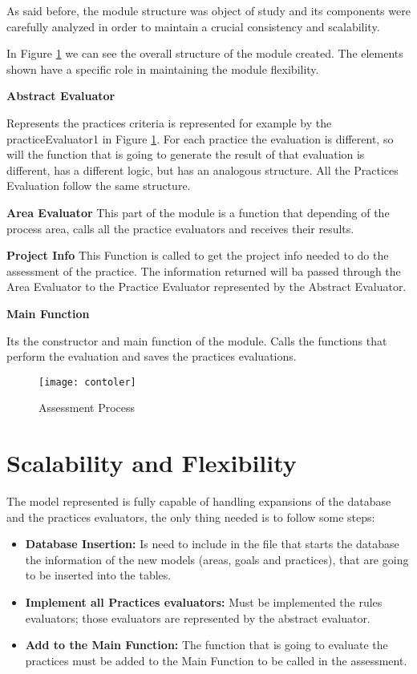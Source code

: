 As said before, the module structure was object of study and its components were carefully analyzed in order to maintain a crucial consistency and scalability.

In Figure \ref{fig:esquema} we can see the overall structure of the module created. The elements shown have a specific role in maintaining the module flexibility. 

\textbf{Abstract Evaluator}

Represents the practices criteria is represented for example by the practiceEvaluator1 in Figure \ref{fig:esquema}. For each practice the evaluation is different, so will the function that is going to generate the result of that evaluation is different, has a different logic, but has an analogous structure. All the Practices Evaluation follow the same structure.

\textbf{Area Evaluator}
This part of the module is a function that depending of the process area, calls all the practice evaluators and receives their results.


\textbf{Project Info}
This Function is called to get the project info needed to do the assessment of the practice. The information returned will ba passed through the Area Evaluator to the Practice Evaluator represented by the Abstract Evaluator.

\textbf{Main Function}

Its the constructor and main function of the module. Calls the functions that perform the evaluation and saves the practices evaluations.


\begin{figure}[f]
	\begin{center}
		\leavevmode
		\texttt{[image: contoler]}
		\caption{Assessment Process}
		\label{fig:esquema}
	\end{center}
\end{figure}

\section{Scalability and Flexibility}

The model represented is fully capable of handling expansions of the database and the practices evaluators, the only thing needed is to follow some steps:
\begin{itemize}
	\item \textbf{Database Insertion: } Is need to include in the file that starts the database the information of the new models (areas, goals and practices), that are going to be inserted into the tables.
	\item \textbf{Implement all Practices evaluators: } Must be implemented the rules evaluators; those evaluators are represented by the abstract evaluator.
	\item \textbf{Add to the Main Function: } The function that is going to evaluate the practices must be added to the Main Function to be called in the assessment.
\end{itemize}

